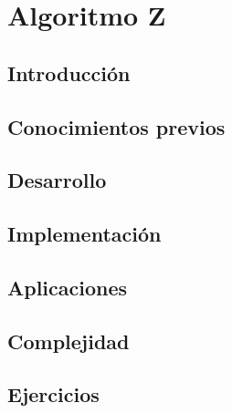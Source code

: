 \chapter{Algoritmo Z}
\section{Introducción}

\section{Conocimientos previos}

\section{Desarrollo}

\section{Implementación}

\section{Aplicaciones}

\section{Complejidad}

\section{Ejercicios}
